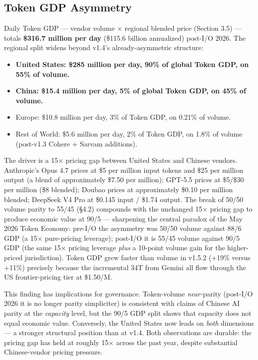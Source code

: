 \documentclass[11pt,a4paper]{article}
\begin{document}
\subsection{Token GDP Asymmetry}

Daily Token GDP --- vendor volume × regional blended price (Section 3.5) --- totals \textbf{\$316.7 million per day} (\$115.6 billion annualized) post-I/O 2026. The regional split widens beyond v1.4's already-asymmetric structure:

\begin{itemize}
  \item \textbf{United States: \$285 million per day, 90\% of global Token GDP, on 55\% of volume.}
  \item \textbf{China: \$15.4 million per day, 5\% of global Token GDP, on 45\% of volume.}
  \item Europe: \$10.8 million per day, 3\% of Token GDP, on 0.21\% of volume.
  \item Rest of World: \$5.6 million per day, 2\% of Token GDP, on 1.8\% of volume (post-v1.3 Cohere + Sarvam additions).
\end{itemize}

The driver is a 15× pricing gap between United States and Chinese vendors. Anthropic's Opus 4.7 prices at \$5 per million input tokens and \$25 per million output (a blend of approximately \$7.50 per million); GPT-5.5 prices at \$5/\$30 per million (\$8 blended); Doubao prices at approximately \$0.10 per million blended; DeepSeek V4 Pro at \$0.145 input / \$1.74 output. The break of 50/50 volume parity to 55/45 (§4.2) compounds with the unchanged 15× pricing gap to produce economic value at 90/5 --- sharpening the central paradox of the May 2026 Token Economy: pre-I/O the asymmetry was 50/50 volume against 88/6 GDP (a 15× pure-pricing leverage); post-I/O it is 55/45 volume against 90/5 GDP (the same 15× pricing leverage \emph{plus} a 10-point volume gain for the higher-priced jurisdiction). Token GDP grew faster than volume in v1.5.2 (+19\% versus +11\%) precisely because the incremental 34T from Gemini all flow through the US frontier-pricing tier at \$1.50/M.

This finding has implications for governance. Token-volume \emph{near-}parity (post-I/O 2026 it is no longer parity simpliciter) is consistent with claims of Chinese AI parity at the \emph{capacity} level, but the 90/5 GDP split shows that capacity does not equal economic value. Conversely, the United States now leads on \emph{both} dimensions --- a stronger structural position than at v1.4. Both observations are durable: the pricing gap has held at roughly 15× across the past year, despite substantial Chinese-vendor pricing pressure.
\end{document}
